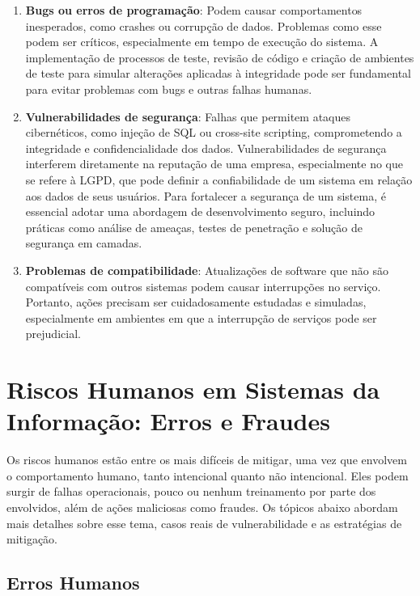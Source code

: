 \documentclass[12pt,oneside,a4paper,article]{abntex2}
\begin{document}
\begin{enumerate}
    \item \textbf{Bugs ou erros de programação}: Podem causar comportamentos inesperados, como crashes ou corrupção de dados. Problemas como esse podem ser críticos, especialmente em tempo de execução do sistema. A implementação de processos de teste, revisão de código e criação de ambientes de teste para simular alterações aplicadas à integridade pode ser fundamental para evitar problemas com bugs e outras falhas humanas.
    
    \item \textbf{Vulnerabilidades de segurança}: Falhas que permitem ataques cibernéticos, como injeção de SQL ou cross-site scripting, comprometendo a integridade e confidencialidade dos dados. Vulnerabilidades de segurança interferem diretamente na reputação de uma empresa, especialmente no que se refere à LGPD, que pode definir a confiabilidade de um sistema em relação aos dados de seus usuários. Para fortalecer a segurança de um sistema, é essencial adotar uma abordagem de desenvolvimento seguro, incluindo práticas como análise de ameaças, testes de penetração e solução de segurança em camadas.
    
    \item \textbf{Problemas de compatibilidade}: Atualizações de software que não são compatíveis com outros sistemas podem causar interrupções no serviço. Portanto, ações precisam ser cuidadosamente estudadas e simuladas, especialmente em ambientes em que a interrupção de serviços pode ser prejudicial.
\end{enumerate}



\newpage

\setcounter{section}{0}
\section{Riscos Humanos em Sistemas da Informação: Erros e Fraudes}

Os riscos humanos estão entre os mais difíceis de mitigar, uma vez que envolvem o comportamento humano, tanto intencional quanto não intencional. Eles podem surgir de falhas operacionais, pouco ou nenhum treinamento por parte dos envolvidos, além de ações maliciosas como fraudes. Os tópicos abaixo abordam mais detalhes sobre esse tema, casos reais de vulnerabilidade e as estratégias de mitigação.

\subsection{Erros Humanos}
\end{document}
